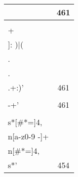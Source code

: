 \begin{table*}
\begin{center}
\begin{tabular}{lc}
\begin{minipage}{2.3in}
\end{minipage}
& 461 \\ 
\midrule
\begin{minipage}{2.3in}
\begin{verbatim}
'(Out\\[[0-9]+\\]: )|(   \\.\\.\\.+:)'\end{verbatim}
\end{minipage}
& 461 \\ 
\midrule
\begin{minipage}{2.3in}
\begin{verbatim}
'\\-+'\end{verbatim}
\end{minipage}
& 461 \\ 
\midrule
\begin{minipage}{2.3in}
\begin{verbatim}
'^\\s*[#*=]{4,}\\n[a-z0-9 -]+\\n[#*=]{4,}\\s*'\end{verbatim}
\end{minipage}
& 454 \\ 
\bottomrule
\end{tabular}
\end{center}
\end{table*}
